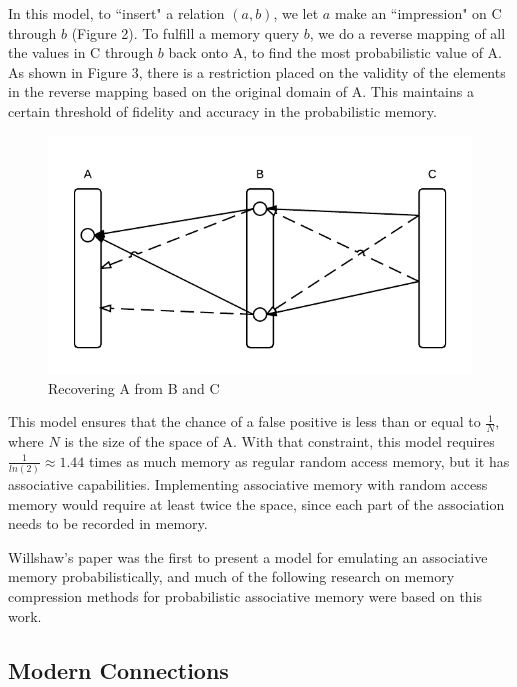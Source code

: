 \documentclass{sig-alternate}
\begin{document}
In this model, to ``insert" a relation $(a, b)$, we let $a$ make an ``impression" on C through $b$ (Figure 2).
To fulfill a memory query $b$, we do a reverse mapping of all the values in C through $b$
back onto A, to find the most probabilistic value of A. As shown in Figure 3, there is a restriction placed on the validity of the
elements in the reverse mapping based on the original domain of A. This maintains a certain threshold of fidelity and accuracy in
the probabilistic memory.

\begin{figure}[H]
	\begin{center}
		\includegraphics[width=1\linewidth]{mapping1}
	\end{center}
	\vspace{-12pt}
	\caption{Recovering A from B and C}
	\label{fig:mapping}
\end{figure}

This model ensures that the chance of a false positive is less than or equal to $\frac{1}{N}$, where $N$
is the size of the space of A. With that constraint, this model requires $\frac{1}{ln(2)} \approx 1.44$
times as much memory as regular random access memory, but it has associative capabilities. 
Implementing associative memory with random access memory would require at least twice the space,
since each part of the association needs to be recorded in memory.

Willshaw's paper was the first to present a model for emulating an associative memory
probabilistically, and much of the following research on memory compression methods
for probabilistic associative memory were based on this work.

\subsection{Modern Connections}
\label{subsec:modern}
\end{document}
